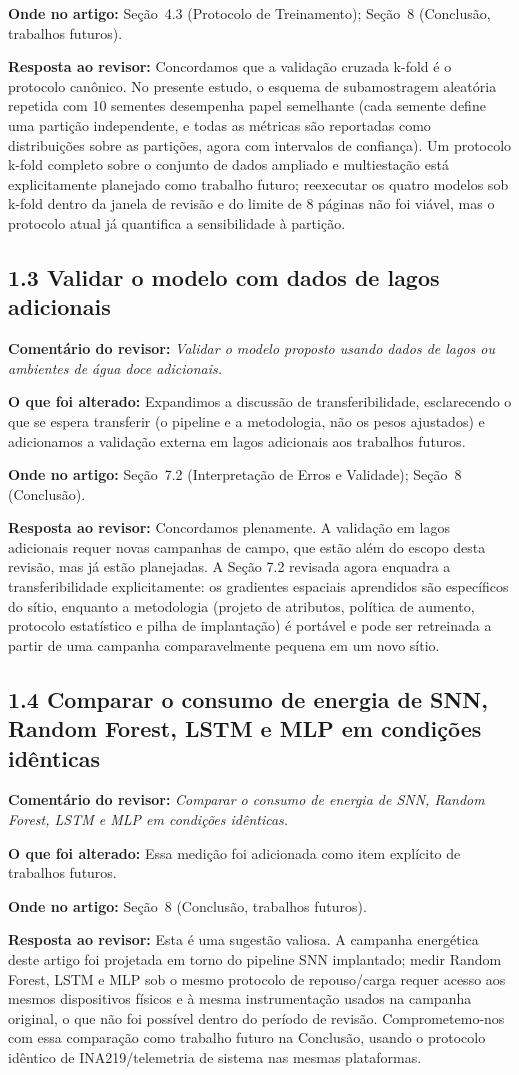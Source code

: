 \documentclass[11pt,a4paper]{article}
\newcommand{\comment}[1]{\textbf{Comentário do revisor:} \textit{#1}}
\newcommand{\change}[1]{\textbf{O que foi alterado:} #1}
\newcommand{\where}[1]{\textbf{Onde no artigo:} #1}
\newcommand{\resp}[1]{\textbf{Resposta ao revisor:} \textcolor{revblue}{#1}}
\newcommand{\pt}[1]{\subsection*{#1}}
\begin{document}
\where{Seção~4.3 (Protocolo de Treinamento); Seção~8 (Conclusão, trabalhos futuros).}

\resp{Concordamos que a validação cruzada k-fold é o protocolo canônico. No presente estudo, o esquema de subamostragem aleatória repetida com 10 sementes desempenha papel semelhante (cada semente define uma partição independente, e todas as métricas são reportadas como distribuições sobre as partições, agora com intervalos de confiança). Um protocolo k-fold completo sobre o conjunto de dados ampliado e multiestação está explicitamente planejado como trabalho futuro; reexecutar os quatro modelos sob k-fold dentro da janela de revisão e do limite de 8 páginas não foi viável, mas o protocolo atual já quantifica a sensibilidade à partição.}

\pt{1.3 Validar o modelo com dados de lagos adicionais}
\comment{Validar o modelo proposto usando dados de lagos ou ambientes de água doce adicionais.}

\change{Expandimos a discussão de transferibilidade, esclarecendo o que se espera transferir (o pipeline e a metodologia, não os pesos ajustados) e adicionamos a validação externa em lagos adicionais aos trabalhos futuros.}

\where{Seção~7.2 (Interpretação de Erros e Validade); Seção~8 (Conclusão).}

\resp{Concordamos plenamente. A validação em lagos adicionais requer novas campanhas de campo, que estão além do escopo desta revisão, mas já estão planejadas. A Seção 7.2 revisada agora enquadra a transferibilidade explicitamente: os gradientes espaciais aprendidos são específicos do sítio, enquanto a metodologia (projeto de atributos, política de aumento, protocolo estatístico e pilha de implantação) é portável e pode ser retreinada a partir de uma campanha comparavelmente pequena em um novo sítio.}

\pt{1.4 Comparar o consumo de energia de SNN, Random Forest, LSTM e MLP em condições idênticas}
\comment{Comparar o consumo de energia de SNN, Random Forest, LSTM e MLP em condições idênticas.}

\change{Essa medição foi adicionada como item explícito de trabalhos futuros.}

\where{Seção~8 (Conclusão, trabalhos futuros).}

\resp{Esta é uma sugestão valiosa. A campanha energética deste artigo foi projetada em torno do pipeline SNN implantado; medir Random Forest, LSTM e MLP sob o mesmo protocolo de repouso/carga requer acesso aos mesmos dispositivos físicos e à mesma instrumentação usados na campanha original, o que não foi possível dentro do período de revisão. Comprometemo-nos com essa comparação como trabalho futuro na Conclusão, usando o protocolo idêntico de INA219/telemetria de sistema nas mesmas plataformas.}
\end{document}
